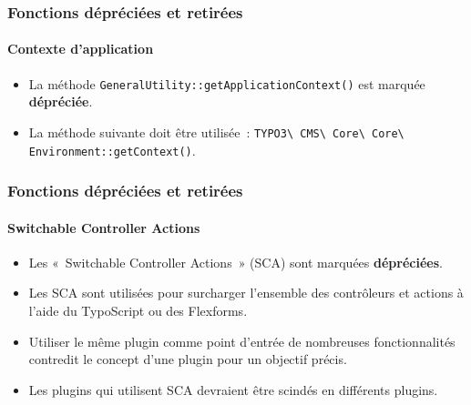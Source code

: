 
\begin{frame}[fragile]
	\frametitle{Fonctions dépréciées et retirées}
	\framesubtitle{Contexte d'application}

	\lstset{basicstyle=\tiny\ttfamily}

	\begin{itemize}
		\item La méthode \texttt{GeneralUtility::getApplicationContext()} est marquée \textbf{dépréciée}.
		\item La méthode suivante doit être utilisée~:\newline
		 	\texttt{TYPO3\textbackslash
				CMS\textbackslash
				Core\textbackslash
				Core\textbackslash
				Environment::getContext()}.

	\end{itemize}

\end{frame}


\begin{frame}[fragile]
	\frametitle{Fonctions dépréciées et retirées}
	\framesubtitle{Switchable Controller Actions}

	\begin{itemize}
		\item Les «~Switchable Controller Actions~» (SCA) sont marquées \textbf{dépréciées}.
		\item Les SCA sont utilisées pour surcharger l'ensemble des contrôleurs et actions à l'aide
			du TypoScript ou des Flexforms.
		\item Utiliser le même plugin comme point d'entrée de nombreuses fonctionnalités contredit
			le concept d'une plugin pour un objectif précis.
		\item Les plugins qui utilisent SCA devraient être scindés en différents plugins.
	\end{itemize}

\end{frame}

